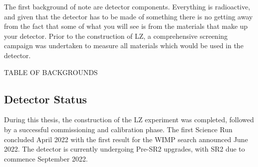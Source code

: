 \par
The first background of note are detector components.
Everything is radioactive, and given that the detector has to be made of something there is no getting away from the fact that some of what you will see is from the materials that make up your detector.
Prior to the construction of LZ, a comprehensive screening campaign was undertaken to measure all materials which would be used in the detector.


\par
TABLE OF BACKGROUNDS


\par

\subsection{Detector Status}
\par
During this thesis, the construction of the LZ experiment was completed, followed by a successful commissioning and calibration phase.
The first Science Run concluded April 2022 with the first result for the WIMP search announced June 2022.
The detector is currently undergoing Pre-SR2 upgrades, with SR2 due to commence September 2022.

